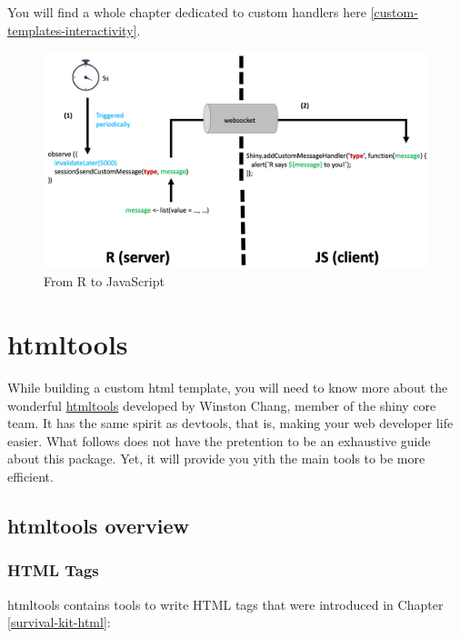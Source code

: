 \documentclass[
]{book}
\begin{document}
You will find a whole chapter dedicated to custom handlers here \ref{custom-templates-interactivity}.

\begin{figure}
\includegraphics[width=20in]{images/survival-kit/shiny-custom-message} \caption{From R to JavaScript}\label{fig:shiny-custom-message}
\end{figure}

\hypertarget{part-htmltools}{%
\part*{htmltools}\label{part-htmltools}}

While building a custom html template, you will need to know more about the wonderful \href{https://github.com/rstudio/htmltools}{htmltools} developed by Winston Chang, member of the shiny core team. It has the same spirit as devtools, that is, making your web developer life easier. What follows does not have the pretention to be an exhaustive guide about this package. Yet, it will provide you yith the main tools to be more efficient.

\hypertarget{htmltools-overview}{%
\chapter{htmltools overview}\label{htmltools-overview}}

\hypertarget{html-tags}{%
\section{HTML Tags}\label{html-tags}}

htmltools contains tools to write HTML tags that were introduced in Chapter \ref{survival-kit-html}:
\end{document}
